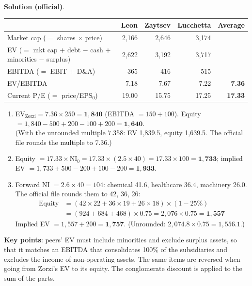 \begin{exbox}
\textbf{Solution (official)}.
\begin{center}
\footnotesize
\begin{tabular}{@{}lrrrr@{}}
\toprule
 & Leon & Zaytsev & Lucchetta & Average\\
\midrule
Market cap ($=$ shares $\times$ price) & 2,166 & 2,646 & 3,174 & \\
EV ($=$ mkt cap $+$ debt $-$ cash $+$ minorities $-$ surplus) & 2,622 & 3,192 & 3,717 & \\
EBITDA ($=$ EBIT $+$ D\&A) & 365 & 416 & 515 & \\
EV/EBITDA & 7.18 & 7.67 & 7.22 & \textbf{7.36}\\
Current P/E ($=$ price$/$EPS$_0$) & 19.00 & 15.75 & 17.25 & \textbf{17.33}\\
\bottomrule
\end{tabular}
\end{center}
\begin{enumerate}[leftmargin=*]
  \item EV$_{\text{Zorzi}}=7.36\times250=\mathbf{1{,}840}$ (EBITDA $=150+100$). Equity $=1{,}840-500+200-100+200=\mathbf{1{,}640}$.\\
  \footnotesize(With the unrounded multiple 7.358: EV 1,839.5, equity 1,639.5. The official file rounds the multiple to 7.36.)\normalsize
  \item Equity $=17.33\times\text{NI}_0=17.33\times(2.5\times40)=17.33\times100=\mathbf{1{,}733}$; implied EV $=1{,}733+500-200+100-200=\mathbf{1{,}933}$.
  \item Forward NI $=2.6\times40=104$: chemical 41.6, healthcare 36.4, machinery 26.0. The official file rounds them to 42, 36, 26:
  \begin{align*}
  \text{Equity}&=(42\times22+36\times19+26\times18)\times(1-25\%)\\
  &=(924+684+468)\times0.75=2{,}076\times0.75=\mathbf{1{,}557}
  \end{align*}
  Implied EV $=1{,}557+200=\mathbf{1{,}757}$. \footnotesize(Unrounded: $2{,}074.8\times0.75=1{,}556.1$.)\normalsize
\end{enumerate}
\textbf{Key points}: peers' EV must include minorities and exclude surplus assets, so that it matches an EBITDA that consolidates 100\% of the subsidiaries and excludes the income of non-operating assets. The same items are reversed when going from Zorzi's EV to its equity. The conglomerate discount is applied to the sum of the parts.
\end{exbox}

